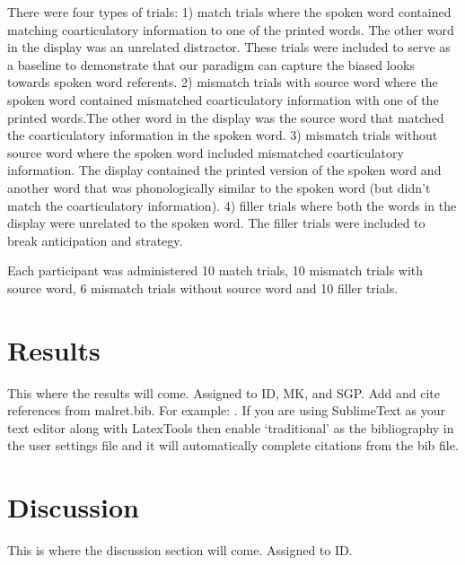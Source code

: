 \documentclass{article}
\begin{document}
There were four types of trials: 1) match trials where the spoken word contained matching coarticulatory information to one of the printed words. The other word in the display was an unrelated distractor. These trials were included to serve as a baseline to demonstrate that our paradigm can capture the biased looks towards spoken word referents. 2) mismatch trials with source word where the spoken word contained mismatched coarticulatory information with one of the printed words.The other word in the display was the source word that matched the coarticulatory information in the spoken word. 3) mismatch trials without source word where the spoken word included mismatched coarticulatory information. The display contained the printed version of the spoken word and another word that was phonologically similar to the spoken word (but didn't match the coarticulatory information). 4) filler trials where both the words in the display were unrelated to the spoken word. The filler trials were included to break anticipation and strategy.

Each participant was administered 10 match trials, 10 mismatch trials with source word, 6 mismatch trials without source word and 10 filler trials.  


\section{Results}
\label{sec:results}
This where the results will come. Assigned to ID, MK, and SGP. Add and cite references from malret.bib. For example: \cite{adank04,tabain1999,pandey2006}. If you are using SublimeText as your text editor along with LatexTools then enable `traditional' as the bibliography in the user settings file and it will automatically complete citations from the bib file.

\section{Discussion}
\label{sec:disc}
This is where the discussion section will come. Assigned to ID.

\end{document}
